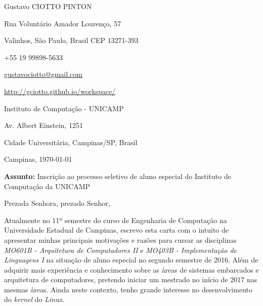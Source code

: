 \documentclass[12pt, a4paper]{article}
\begin{document}
\pagestyle{empty} 

Gustavo CIOTTO PINTON

Rua Voluntário Amador Lourenço, 57

Valinhos, São Paulo, Brasil CEP 13271-393

+55 19 99898-5633

 \url{gustavociotto@gmail.com}

\url{http://gciotto.github.io/workspace/}
\begin{flushright}


Instituto de Computação - UNICAMP

Av. Albert Einstein, 1251

Cidade Universitária, Campinas/SP, Brasil



\end{flushright}


\vspace{12pt}

Campinas,  \today

\vspace{12pt}

\textbf{Assunto:} Inscrição ao processo seletivo de aluno especial do Instituto
de Computação da UNICAMP

\vspace{12pt} 

Prezada Senhora, prezado Senhor, 

\vspace{12pt}

Atualmente no 11º semestre do curso de Engenharia de Computação na Universidade
Estadual de Campinas, escrevo esta carta com o intuito de apresentar minhas
principais motivações e razões para cursar as disciplinas \textit{MO601B -
Arquitetura de Computadores II} e \textit{MO403B - Implementação de Linguagens
I} na situação de aluno especial no segundo semestre de 2016. Além de adquirir
mais experiência e conhecimento sobre as áreas de sistemas embarcados e
arquitetura de computadores, pretendo iniciar um mestrado no início de 2017 nas
mesmas áreas. Ainda neste contexto, tenho grande interesse no
desenvolvimento do \textit{kernel} do \textit{Linux}.
\end{document}
